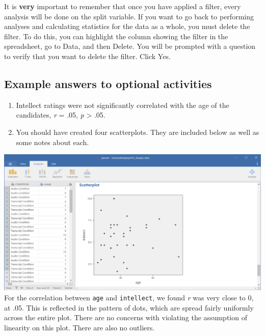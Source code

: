 \documentclass[
]{book}
\begin{document}
It is \textbf{very} important to remember that once you have applied a filter, every analysis will be done on the split variable. If you want to go back to performing analyses and calculating statistics for the data as a whole, you must delete the filter. To do this, you can highlight the column showing the filter in the spreadsheet, go to {Data}, and then {Delete}. You will be prompted with a question to verify that you want to delete the filter. Click {Yes}.

\hypertarget{example-answers-to-optional-activities-1}{%
\subsection{Example answers to optional activities}\label{example-answers-to-optional-activities-1}}

\begin{enumerate}
\def\labelenumi{\arabic{enumi}.}
\item
  Intellect ratings were not significantly correlated with the age of the candidates, \emph{r} = .05, \emph{p} \textgreater{} .05.
\item
  You should have created four scatterplots. They are included below as well as some notes about each.
\end{enumerate}

\includegraphics{img/7.4.69.png}
For the correlation between \texttt{age} and \texttt{intellect}, we found \emph{r} was very close to 0, at .05. This is reflected in the pattern of dots, which are spread fairly uniformly across the entire plot. There are no concerns with violating the assumption of linearity on this plot. There are also no outliers.
\end{document}
